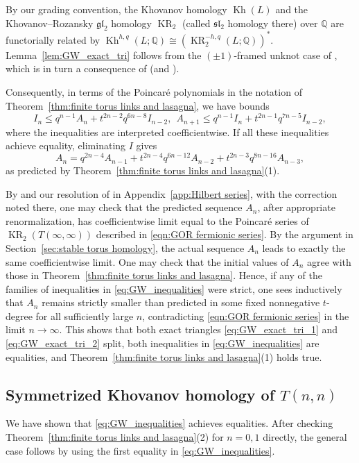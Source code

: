 \documentclass[reqno]{amsart}
\theoremstyle{definition}
\theoremstyle{remark}
\newcommand{\QQ}{\mathbb{Q}}
\DeclareMathOperator{\KR}{KR}
\DeclareMathOperator{\Kh}{Kh}
\begin{document}
By our grading convention, the Khovanov homology $\Kh(L)$ \cite{khovanov2000categorification} and the Khovanov--Rozansky $\mathfrak{gl}_2$ homology $\KR_2$ \cite{khovanov2008matrix} (called $\mathfrak{sl}_2$ homology there) over $\QQ$ are functorially related by $\Kh^{h,q}(L;\QQ)\cong(\KR_2^{-h,q}(L;\QQ))^*$. Lemma~\ref{lem:GW_exact_tri} follows from the $(\pm1)$-framed unknot case of \cite[Theorem~1.6.4]{ren2026khovanov}, which is in turn a consequence of \cite[Theorem~5.1 and Corollary~6.4]{gorsky2023evaluations} (and \cite[Proposition~1.4.3]{ren2026khovanov}).

Consequently, in terms of the Poincar\'e polynomials in the notation of Theorem~\ref{thm:finite torus links and lasagna}, we have bounds
\begin{equation}\label{eq:GW_inequalities}
I_n\le q^{n-1}A_n+t^{2n-2}q^{6n-8}I_{n-2},\ \ A_{n+1}\le q^{n-1}I_{n}+t^{2n-1}q^{7n-5}I_{n-2},
\end{equation}
where the inequalities are interpreted coefficientwise. If all these inequalities achieve equality, eliminating $I$ gives
$$A_n=q^{2n-4}A_{n-1}+t^{2n-4}q^{6n-12}A_{n-2}+t^{2n-3}q^{8n-16}A_{n-3},$$ as predicted by Theorem~\ref{thm:finite torus links and lasagna}(1).

By \cite[Theorem~4.7]{gorsky2013stable} and our resolution of \cite[Conjecture~4.9]{gorsky2013stable} in Appendix~\ref{app:Hilbert series}, with the correction noted there, one may check that the predicted sequence $A_n$, after appropriate renormalization, has coefficientwise limit equal to the Poincar\'e series of $\KR_2(T(\infty,\infty))$ described in \eqref{eqn:GOR fermionic series}. By the argument in Section~\ref{sec:stable torus homology}, the actual sequence $A_n$ leads to exactly the same coefficientwise limit. One may check that the initial values of $A_n$ agree with those in Theorem~\ref{thm:finite torus links and lasagna}. Hence, if any of the families of inequalities in \eqref{eq:GW_inequalities} were strict, one sees inductively that $A_n$ remains strictly smaller than predicted in some fixed nonnegative $t$-degree for all sufficiently large $n$, contradicting \eqref{eqn:GOR fermionic series} in the limit $n\to\infty$. This shows that both exact triangles \eqref{eq:GW_exact_tri_1} and \eqref{eq:GW_exact_tri_2} split, both inequalities in \eqref{eq:GW_inequalities} are equalities, and Theorem~\ref{thm:finite torus links and lasagna}(1) holds true.

\subsection{Symmetrized Khovanov homology of \texorpdfstring{$T(n,n)$}{T(n,n)}}
We have shown that \eqref{eq:GW_inequalities} achieves equalities. After checking Theorem~\ref{thm:finite torus links and lasagna}(2) for $n=0,1$ directly, the general case follows by using the first equality in \eqref{eq:GW_inequalities}.
\end{document}
